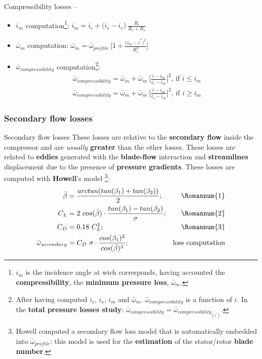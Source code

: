 	{\nologo
	\begin{frame}{Compressibility losses -- }
		\begin{itemize}
			\item $i_m$ computation\footnote{$i_m$ is the incidence angle at wich corresponds, having accounted the \textbf{compressibility}, the \textbf{minimum pressure loss}, $\bar{\omega}_m$.}: $i_m = i_c + \Big( i_s - i_c \Big) \ \frac{R_c}{R_c + R_s}$
			\item $\bar{\omega}_{m}$ computation: $\bar{\omega}_{m} = \bar{\omega}_{profile} \ \Bigg[ 1 + \frac{\big( i_m - i^{*} \big)^2}{R_s^{2}} \Bigg]$
			\item $\bar{\omega}_{compressibility}$ computation\footnote{After having computed $i_c$, $i_s$, $i_m$ and $\bar{\omega}_m$. $\bar{\omega}_{compressibility}$ is a function of $i$. In the \textbf{total pressure losses study}: $\bar{\omega}_{compressibility} = \bar{\omega}_{compressibility_{(i^*)}}$.}: 
				\begin{align}
					\bar{\omega}_{compressibility} = \bar{\omega}_m + \bar{\omega}_m \ \Bigg[ \frac{i - i_m}{i_c - i_m} \Bigg]^2 \text{, if } i \leq i_m\nonumber \\ 
					\bar{\omega}_{compressibility} = \bar{\omega}_m + \bar{\omega}_m \ \Bigg[ \frac{i - i_m}{i_s - i_m} \Bigg]^2 \text{, if } i \geq i_m \nonumber 
				\end{align}
		\end{itemize}
	\end{frame}
	}

\subsubsection{Secondary flow losses}
	\begin{frame}{Secondary flow losses}
		These losses are relative to the \textbf{secondary flow} inside the compressor and are \textit{usually} \textbf{greater} than the other losses. These losses are related to \textbf{eddies} generated with the \textbf{blade-flow} interaction and \textbf{streamlines} displacement due to the presence of \textbf{pressure gradients}. 
		\newline 
		These losses are computed with \textbf{Howell}'s model \cite[Ch. 6]{axial2004}\footnote{Howell computed a secondary flow loss model that is automatically embedded into $\bar{\omega}_{profile}$: this model is used for the \textbf{estimation} of the stator/rotor \textbf{blade number}.}:
		\begin{align}
			\bar{\beta} & = \frac{arctan( tan( \beta_1 ) + tan( \beta_2 ) )}{2}; & \text{\Romannum{1}} \nonumber \\ 
			C_{L} & = 2 \ cos( \bar{\beta} ) \cdot \frac{tan( \beta_1 ) - tan( \beta_2 )}{\sigma}; & \text{\Romannum{2}} \nonumber \\
			C_{D} & = 0.18 \ C_{L}^2; & \text{\Romannum{3}} \nonumber \\
			\bar{\omega}_{secondary} & = C_{D} \ \sigma \cdot \frac{cos( \beta_1 )^2}{cos( \bar{\beta} )^3}; & \text{loss computation} \nonumber 
		\end{align}
	\end{frame}

